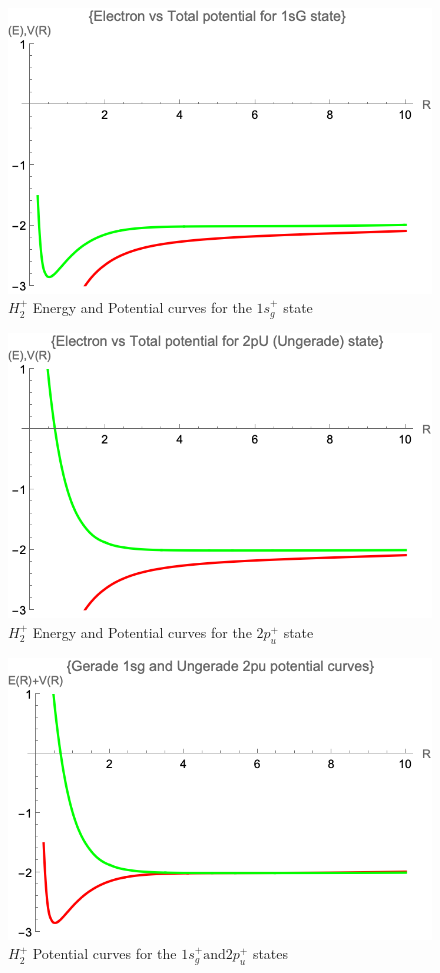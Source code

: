 \begin{figure}
  \includegraphics{H2_1sG-Potential.png}
  \caption{$ H_2^{+} $ Energy and Potential curves for the $ 1s_g^{+} $ state}
\end{figure}

\begin{figure}
  \includegraphics{H2_2pU-Potential.png}
  \caption{$ H_2^{+} $ Energy and Potential curves for the $ 2p_u^{+} $ state}
\end{figure}


\begin{figure}
  \includegraphics{	H2_sGpU-Potential.png}
  \caption{$ H_2^{+} $ Potential curves for the $1s_g^{+} \text{and} 2p_u^{+} $ states}
\end{figure}
